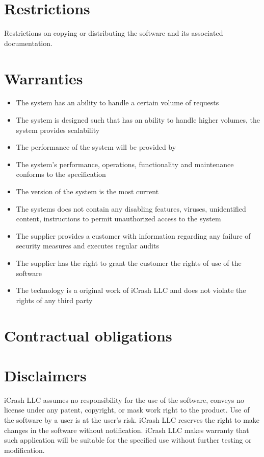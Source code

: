 \section{Restrictions}
Restrictions on copying or distributing the software and its associated
documentation.

\section{Warranties}
\begin{itemize}
  \item The system has an ability to handle a certain volume of requests
  \item The system is designed such that has an ability to handle higher volumes, the system provides scalability
  \item The performance of the system will be provided by
  \item The system's performance, operations, functionality and maintenance
  conforms to the specification
  \item The version of the system is the most current
  \item The systems does not contain any disabling features, viruses, unidentified content, instructions to permit unauthorized access to the system
  \item The supplier provides a customer with information regarding any failure of security measures and executes regular audits
  \item The supplier has the right to grant the customer the rights of use of the software
  \item The technology is a original work of iCrash LLC and does not violate the rights of any third party
\end{itemize}

\section{Contractual obligations}

\section{Disclaimers}

iCrash LLC assumes no responsibility for the use of the software, conveys no
license under any patent, copyright, or mask work right to the product.
Use of the software by a user is at the user's risk.
iCrash LLC reserves the right to make changes in the software without notification.
iCrash LLC makes warranty that such application will be suitable for the specified use without further testing or modification.

